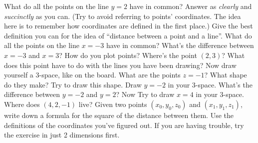 \documentclass[12pt]{exam}
\begin{document}
\begin{questions}

\question
What do all the points on the line $y = 2$ have in common? Answer as \emph{clearly} and \emph{succinctly} as you can. (Try to avoid referring to points' coordinates. The idea here is to remember how coordinates are defined in the first place.)
\question
Give the best definition you can for the idea of ``distance between a point and a line''.
\question
What do all the points on the line $x = -3$ have in common? What's the difference between $x = -3$ and $x = 3$?
\newpage
\question 
How do you plot points? Where's the point $(2, 3)$? What does this point have to do with the lines you have been drawing?
\question
Now draw yourself a 3-space, like on the board. What are the points $z = -1$? What shape do they make? Try to draw this shape.
\question 
Draw $y = -2$ in your 3-space. What's the difference between $y = -2$ and $y = 2$? Now Try to draw $x = 4$ in your 3-space. Where does $(4, 2, -1)$ live?
\question 
Given two points $(x_0, y_0, z_0)$ and $(x_1, y_1, z_1)$, write down a formula for the square of the distance between them. Use the definitions of the coordinates you've figured out. If you are having trouble, try the exercise in just 2 dimensions first.
\end{questions} 
\end{document}
